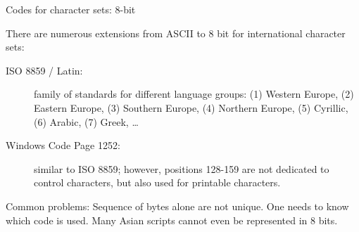 \begin{vbframe}{Codes for character sets: 8-bit}

There are numerous extensions from ASCII to $8$ bit for international character sets:
\begin{description}
 \item[ISO 8859 / Latin:] family of standards for different
  language groups: (1) Western Europe, (2) Eastern Europe, (3) Southern Europe, (4)
  Northern Europe, (5) Cyrillic, (6) Arabic, (7) Greek, \ldots
 \item[Windows Code Page 1252:] similar to ISO 8859; however, positions
  128-159 are not dedicated to control characters, but also used for printable characters.
\end{description}

Common problems: Sequence of bytes alone are not unique. One
needs to know which code is used. Many Asian scripts
cannot even be represented in 8 bits.
\end{vbframe}


